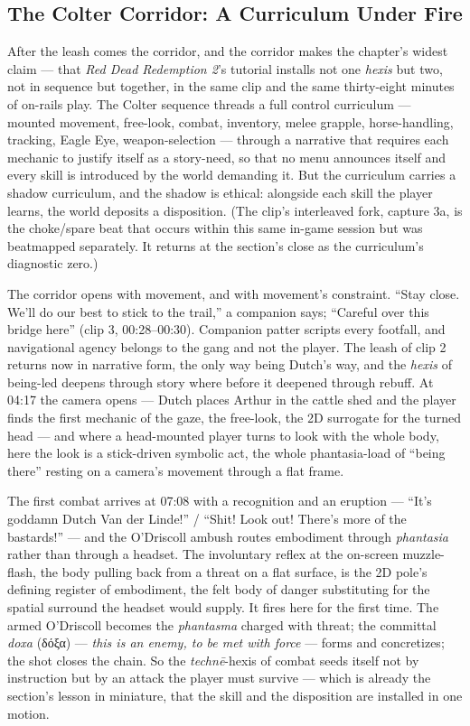 \documentclass{article}
\newcommand{\gk}[1]{{\greekfont #1}}
\begin{document}
\bigskip

\subsection*{The Colter Corridor: A Curriculum Under Fire}

After the leash comes the corridor, and the corridor makes the chapter's widest claim — that \textit{Red Dead Redemption 2}'s tutorial installs not one \textit{hexis} but two, not in sequence but together, in the same clip and the same thirty-eight minutes of on-rails play. The Colter sequence threads a full control curriculum — mounted movement, free-look, combat, inventory, melee grapple, horse-handling, tracking, Eagle Eye, weapon-selection — through a narrative that requires each mechanic to justify itself as a story-need, so that no menu announces itself and every skill is introduced by the world demanding it. But the curriculum carries a shadow curriculum, and the shadow is ethical: alongside each skill the player learns, the world deposits a disposition. (The clip's interleaved fork, capture 3a, is the choke/spare beat that occurs within this same in-game session but was beatmapped separately. It returns at the section's close as the curriculum's diagnostic zero.)

The corridor opens with movement, and with movement's constraint. ``Stay close. We'll do our best to stick to the trail,'' a companion says; ``Careful over this bridge here'' (clip 3, 00:28–00:30). Companion patter scripts every footfall, and navigational agency belongs to the gang and not the player. The leash of clip 2 returns now in narrative form, the only way being Dutch's way, and the \textit{hexis} of being-led deepens through story where before it deepened through rebuff. At 04:17 the camera opens — Dutch places Arthur in the cattle shed and the player finds the first mechanic of the gaze, the free-look, the 2D surrogate for the turned head — and where a head-mounted player turns to look with the whole body, here the look is a stick-driven symbolic act, the whole phantasia-load of ``being there'' resting on a camera's movement through a flat frame.

The first combat arrives at 07:08 with a recognition and an eruption — ``It's goddamn Dutch Van der Linde!'' / ``Shit! Look out! There's more of the bastards!'' — and the O'Driscoll ambush routes embodiment through \textit{phantasia} rather than through a headset. The involuntary reflex at the on-screen muzzle-flash, the body pulling back from a threat on a flat surface, is the 2D pole's defining register of embodiment, the felt body of danger substituting for the spatial surround the headset would supply. It fires here for the first time. The armed O'Driscoll becomes the \textit{phantasma} charged with threat; the committal \textit{doxa} (\gk{δόξα}) — \textit{this is an enemy, to be met with force} — forms and concretizes; the shot closes the chain. So the \textit{technē}-hexis of combat seeds itself not by instruction but by an attack the player must survive — which is already the section's lesson in miniature, that the skill and the disposition are installed in one motion.
\end{document}
